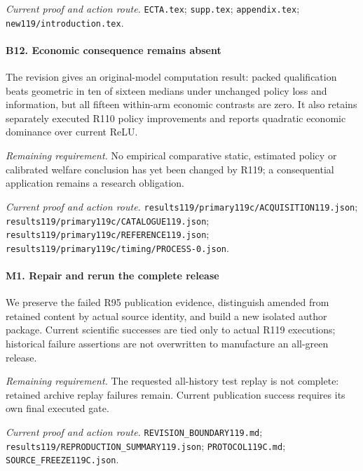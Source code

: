 \par\emph{Current proof and action route.} \nolinkurl{ECTA.tex}; \nolinkurl{supp.tex}; \nolinkurl{appendix.tex}; \nolinkurl{new119/introduction.tex}.

\paragraph{B12. Economic consequence remains absent}

The revision gives an original-model computation result: packed qualification beats geometric in ten of sixteen medians under unchanged policy loss and information, but all fifteen within-arm economic contrasts are zero. It also retains separately executed R110 policy improvements and reports quadratic economic dominance over current ReLU.

\par\emph{Remaining requirement.} No empirical comparative static, estimated policy or calibrated welfare conclusion has yet been changed by R119; a consequential application remains a research obligation.

\par\emph{Current proof and action route.} \nolinkurl{results119/primary119c/ACQUISITION119.json}; \nolinkurl{results119/primary119c/CATALOGUE119.json}; \nolinkurl{results119/primary119c/REFERENCE119.json}; \nolinkurl{results119/primary119c/timing/PROCESS-0.json}.

\paragraph{M1. Repair and rerun the complete release}

We preserve the failed R95 publication evidence, distinguish amended from retained content by actual source identity, and build a new isolated author package. Current scientific successes are tied only to actual R119 executions; historical failure assertions are not overwritten to manufacture an all-green release.

\par\emph{Remaining requirement.} The requested all-history test replay is not complete: retained archive replay failures remain. Current publication success requires its own final executed gate.

\par\emph{Current proof and action route.} \nolinkurl{REVISION_BOUNDARY119.md}; \nolinkurl{results119/REPRODUCTION_SUMMARY119.json}; \nolinkurl{PROTOCOL119C.md}; \nolinkurl{SOURCE_FREEZE119C.json}.

